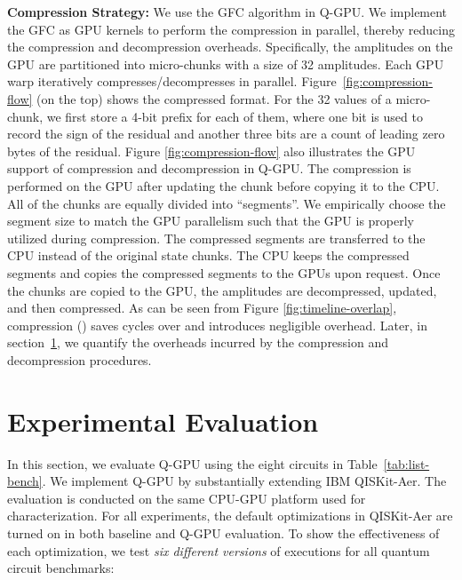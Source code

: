 \noindent \textbf{Compression Strategy:}
We use the GFC algorithm \cite{10.1145/1964179.1964189} in Q-GPU. We implement the GFC as GPU kernels to perform the compression in parallel, thereby reducing the compression and decompression overheads. Specifically, the amplitudes on the GPU are partitioned into micro-chunks with a size of 32 amplitudes. Each GPU warp iteratively compresses/decompresses in parallel. Figure~\ref{fig:compression-flow} (on the top) shows the compressed format. For the 32 values of a micro-chunk, we first store a 4-bit prefix for each of them, where one bit is used to record the sign of the residual and another three bits are a count of leading zero bytes of the residual. 
Figure \ref{fig:compression-flow} also illustrates the GPU support of compression and decompression in Q-GPU. The compression is performed on the GPU after updating the chunk before copying it to the CPU. All of the chunks are equally divided into ``segments''. We empirically choose the segment size to match the GPU parallelism such that the GPU is properly utilized during compression. The compressed segments are transferred to the CPU instead of the original state chunks. 
The CPU keeps the compressed segments and copies the compressed segments to the GPUs upon request. Once the chunks are copied to the GPU, the amplitudes are decompressed, updated, and then compressed. 
As can be seen from Figure \ref{fig:timeline-overlap}, compression () saves  cycles over  and introduces negligible overhead. Later, in section~\ref{sec:exp}, we quantify the overheads incurred by the compression and decompression procedures. 

\section{Experimental Evaluation}
\label{sec:exp}

In this section, we evaluate Q-GPU using the eight circuits in Table~\ref{tab:list-bench}. We implement Q-GPU by substantially extending IBM QISKit-Aer. The evaluation is conducted on the same CPU-GPU platform used for characterization. For all experiments, the default optimizations in QISKit-Aer are turned on in both baseline and Q-GPU evaluation. To show the effectiveness of each optimization, we test \emph{six different versions} of executions for all quantum circuit benchmarks:

